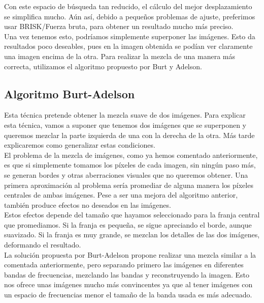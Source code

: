 \documentclass[10pt,a4paper]{article}
\theoremstyle{definition}
\begin{document}
Con este espacio de búsqueda tan reducido, el cálculo del mejor desplazamiento se simplifica mucho. Aún así, debido a pequeños problemas de ajuste, preferimos usar BRISK/Fuerza bruta, para obtener un resultado mucho más preciso.\\

Una vez tenemos esto, podríamos simplemente superponer las imágenes. Esto da resultados poco deseables, pues en la imagen obtenida se podían ver claramente una imagen encima de la otra. Para realizar la mezcla de una manera más correcta, utilizamos el algoritmo propuesto por Burt y Adelson.\\

\subsection{Algoritmo Burt-Adelson}

Esta técnica pretende obtener la mezcla suave de dos imágenes. Para explicar esta técnica, vamos a suponer que tenemos dos imágenes que se superponen y queremos mezclar la parte izquierda de una con la derecha de la otra. Más tarde explicaremos como generalizar estas condiciones.\\

El problema de la mezcla de imágenes, como ya hemos comentado anteriormente, es que si simplemente tomamos los píxeles de cada imagen, sin ningún paso más, se generan bordes y otras aberraciones visuales que no queremos obtener. Una primera aproximación al problema sería promediar de alguna manera los píxeles centrales de ambas imágenes. Pese a ser una mejora del algoritmo anterior, también produce efectos no deseados en las imágenes.\\

Estos efectos depende del tamaño que hayamos seleccionado para la franja central que promediamos. Si la franja es pequeña, se sigue apreciando el borde, aunque suavizado. Si la franja es muy grande, se mezclan los detalles de las dos imágenes, deformando el resultado.\\

La solución propuesta por Burt-Adelson propone realizar una mezcla similar a la comentada anteriormente, pero separando primero las imágenes en diferentes bandas de frecuencias, mezclando las bandas y reconstruyendo la imagen. Esto nos ofrece unas imágenes mucho más convincentes ya que al tener imágenes con un espacio de frecuencias menor el tamaño de la banda usada es más adecuado.\\
\end{document}
